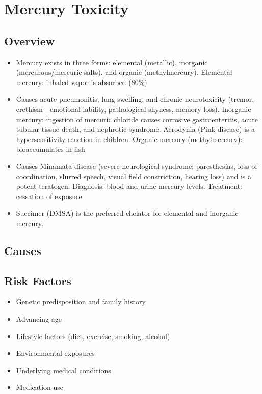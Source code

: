 \chapter{Mercury Toxicity}
\label{sec:Mercury Toxicity}

\section{Overview}


\begin{itemize}[noitemsep]
  \item Mercury exists in three forms: elemental (metallic), inorganic (mercurous/mercuric salts), and organic (methylmercury). Elemental mercury: inhaled vapor is absorbed (80\%)
  \item Causes acute pneumonitis, lung swelling, and chronic neurotoxicity (tremor, erethism---emotional lability, pathological shyness, memory loss). Inorganic mercury: ingestion of mercuric chloride causes corrosive gastroenteritis, acute tubular tissue death, and nephrotic syndrome. Acrodynia (Pink disease) is a hypersensitivity reaction in children. Organic mercury (methylmercury): bioaccumulates in fish
  \item Causes Minamata disease (severe neurological syndrome: paresthesias, loss of coordination, slurred speech, visual field constriction, hearing loss) and is a potent teratogen. Diagnosis: blood and urine mercury levels. Treatment: cessation of exposure
  \item Succimer (DMSA) is the preferred chelator for elemental and inorganic mercury.
\end{itemize}
\section{Causes}
\section{Risk Factors}

\begin{itemize}[noitemsep]
  \item Genetic predisposition and family history
  \item Advancing age
  \item Lifestyle factors (diet, exercise, smoking, alcohol)
  \item Environmental exposures
  \item Underlying medical conditions
  \item Medication use
\end{itemize}
